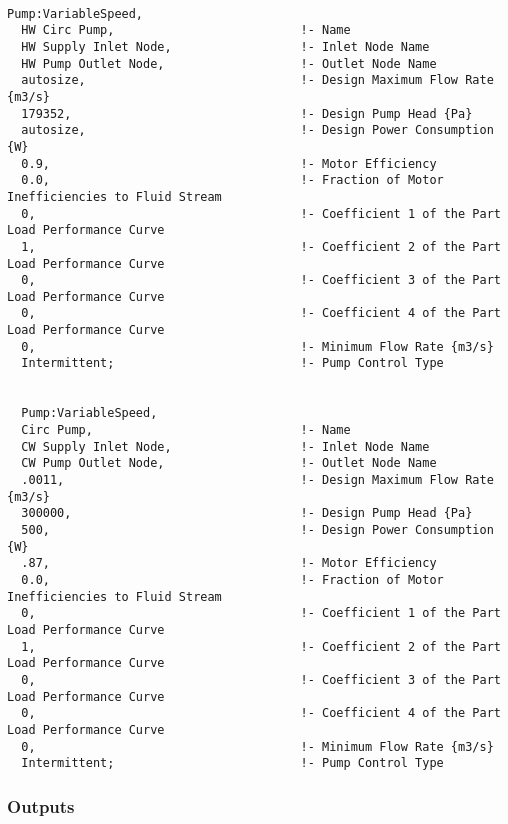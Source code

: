 \begin{lstlisting}

Pump:VariableSpeed,
  HW Circ Pump,                          !- Name
  HW Supply Inlet Node,                  !- Inlet Node Name
  HW Pump Outlet Node,                   !- Outlet Node Name
  autosize,                              !- Design Maximum Flow Rate {m3/s}
  179352,                                !- Design Pump Head {Pa}
  autosize,                              !- Design Power Consumption {W}
  0.9,                                   !- Motor Efficiency
  0.0,                                   !- Fraction of Motor Inefficiencies to Fluid Stream
  0,                                     !- Coefficient 1 of the Part Load Performance Curve
  1,                                     !- Coefficient 2 of the Part Load Performance Curve
  0,                                     !- Coefficient 3 of the Part Load Performance Curve
  0,                                     !- Coefficient 4 of the Part Load Performance Curve
  0,                                     !- Minimum Flow Rate {m3/s}
  Intermittent;                          !- Pump Control Type


  Pump:VariableSpeed,
  Circ Pump,                             !- Name
  CW Supply Inlet Node,                  !- Inlet Node Name
  CW Pump Outlet Node,                   !- Outlet Node Name
  .0011,                                 !- Design Maximum Flow Rate {m3/s}
  300000,                                !- Design Pump Head {Pa}
  500,                                   !- Design Power Consumption {W}
  .87,                                   !- Motor Efficiency
  0.0,                                   !- Fraction of Motor Inefficiencies to Fluid Stream
  0,                                     !- Coefficient 1 of the Part Load Performance Curve
  1,                                     !- Coefficient 2 of the Part Load Performance Curve
  0,                                     !- Coefficient 3 of the Part Load Performance Curve
  0,                                     !- Coefficient 4 of the Part Load Performance Curve
  0,                                     !- Minimum Flow Rate {m3/s}
  Intermittent;                          !- Pump Control Type
\end{lstlisting}

\subsubsection{Outputs}\label{outputs-026}

